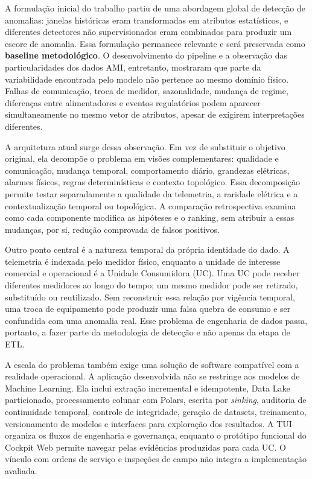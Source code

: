 A formulação inicial do trabalho partiu de uma abordagem global de detecção de anomalias: janelas históricas eram transformadas em atributos estatísticos, e diferentes detectores não supervisionados eram combinados para produzir um escore de anomalia. Essa formulação permanece relevante e será preservada como \textbf{baseline metodológico}. O desenvolvimento do pipeline e a observação das particularidades dos dados AMI, entretanto, mostraram que parte da variabilidade encontrada pelo modelo não pertence ao mesmo domínio físico. Falhas de comunicação, troca de medidor, sazonalidade, mudança de regime, diferenças entre alimentadores e eventos regulatórios podem aparecer simultaneamente no mesmo vetor de atributos, apesar de exigirem interpretações diferentes.

A arquitetura atual surge dessa observação. Em vez de substituir o objetivo original, ela decompõe o problema em visões complementares: qualidade e comunicação, mudança temporal, comportamento diário, grandezas elétricas, alarmes físicos, regras determinísticas e contexto topológico. Essa decomposição permite testar separadamente a qualidade da telemetria, a raridade elétrica e a contextualização temporal ou topológica. A comparação retrospectiva examina como cada componente modifica as hipóteses e o ranking, sem atribuir a essas mudanças, por si, redução comprovada de falsos positivos.

Outro ponto central é a natureza temporal da própria identidade do dado. A telemetria é indexada pelo medidor físico, enquanto a unidade de interesse comercial e operacional é a Unidade Consumidora (UC). Uma UC pode receber diferentes medidores ao longo do tempo; um mesmo medidor pode ser retirado, substituído ou reutilizado. Sem reconstruir essa relação por vigência temporal, uma troca de equipamento pode produzir uma falsa quebra de consumo e ser confundida com uma anomalia real. Esse problema de engenharia de dados passa, portanto, a fazer parte da metodologia de detecção e não apenas da etapa de ETL.

A escala do problema também exige uma solução de software compatível com a realidade operacional. A aplicação desenvolvida não se restringe aos modelos de Machine Learning. Ela inclui extração incremental e idempotente, Data Lake particionado, processamento colunar com Polars, escrita por \emph{sinking}, auditoria de continuidade temporal, controle de integridade, geração de datasets, treinamento, versionamento de modelos e interfaces para exploração dos resultados. A TUI organiza os fluxos de engenharia e governança, enquanto o protótipo funcional do Cockpit Web permite navegar pelas evidências produzidas para cada UC. O vínculo com ordens de serviço e inspeções de campo não integra a implementação avaliada.

